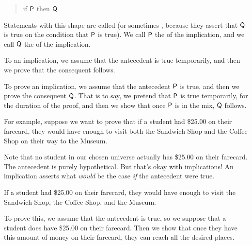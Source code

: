 \documentclass[../../../main.tex]{subfiles}
\begin{document}
\begin{quote}
  if $\P/$ then $\Q/$
\end{quote}

\noindent
Statements with this shape are called  (or sometimes , because they assert that $\Q/$ is true on the condition that $\P/$ is true). We call $\P/$ the  of the implication, and we call $\Q/$ the  of the implication.

\begin{aside}
  \begin{remark}
    To  an implication, we assume that the antecedent is true temporarily, and then we prove that the consequent follows.
  \end{remark}
\end{aside}

To prove an implication, we assume that the antecedent $\P/$ is true, and then we prove the consequent $\Q/$. That is to say, we pretend that $\P/$ is true temporarily, for the duration of the proof, and then we show that once $\P/$ is in the mix, $\Q/$ follows.

For example, suppose we want to prove that if a student had \$25.00 on their farecard, they would have enough to visit both the Sandwich Shop and the Coffee Shop on their way to the Museum. 

\begin{aside}
  \begin{remark}
    Note that no student in our chosen universe actually has \$25.00 on their farecard. The antecedent is purely hypothetical. But that's okay with implications! An implication asserts what \emph{would} be the case \emph{if} the antecedent were true.
  \end{remark}
\end{aside}

\begin{framed}
  \begin{theorem}
    If a student had \$25.00 on their farecard, they would have enough to visit the Sandwich Shop, the Coffee Shop, and the Museum.
  \end{theorem}
\end{framed}

To prove this, we assume that the antecedent is true, so we suppose that a student does have \$25.00 on their farecard. Then we show that once they have this amount of money on their farecard, they can reach all the desired places.
\end{document}
